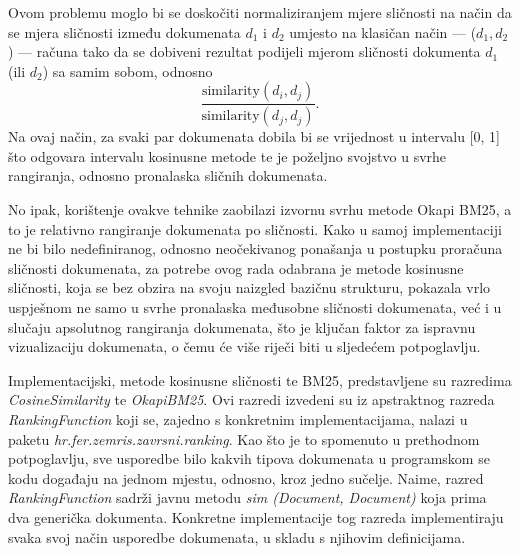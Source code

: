 \documentclass[times, utf8, zavrsni]{fer}
\begin{document}
Ovom problemu moglo bi se doskočiti normaliziranjem mjere sličnosti na način da se mjera sličnosti između dokumenata $d_1$ i $d_2$ umjesto na klasičan način — ($d_1, d_2$) — računa tako da se dobiveni rezultat podijeli mjerom sličnosti dokumenta $d_1$ (ili $d_2$) sa samim sobom, odnosno
\begin{equation}
\frac{\text{similarity}(d_i, d_j)}{\text{similarity}(d_j, d_j)}.
\label{eq:docsim}
\end{equation}
Na ovaj način, za svaki par dokumenata dobila bi se vrijednost u intervalu [0, 1] što odgovara intervalu kosinusne metode te je poželjno svojstvo u svrhe rangiranja, odnosno pronalaska sličnih dokumenata. \par
No ipak, korištenje ovakve tehnike zaobilazi izvornu svrhu metode Okapi BM25, a to je relativno rangiranje dokumenata po sličnosti. Kako u samoj implementaciji ne bi bilo nedefiniranog, odnosno neočekivanog ponašanja u postupku proračuna sličnosti dokumenata, za potrebe ovog rada odabrana je metode kosinusne sličnosti, koja se bez obzira na svoju naizgled bazičnu strukturu, pokazala vrlo uspješnom ne samo u svrhe pronalaska međusobne sličnosti dokumenata, već i u slučaju apsolutnog rangiranja dokumenata, što je ključan faktor za ispravnu vizualizaciju dokumenata, o čemu će više riječi biti u sljedećem potpoglavlju.

Implementacijski, metode kosinusne sličnosti te BM25, predstavljene su razredima \textit{CosineSimilarity} te \textit{OkapiBM25}. Ovi razredi izvedeni su iz apstraktnog razreda \textit{RankingFunction} koji se, zajedno s konkretnim implementacijama, nalazi u paketu \textit{hr.fer.zemris.zavrsni.ranking}. Kao što je to spomenuto u prethodnom potpoglavlju, sve usporedbe bilo kakvih tipova dokumenata u programskom se kodu događaju na jednom mjestu, odnosno, kroz jedno sučelje. Naime, razred \textit{RankingFunction} sadrži javnu metodu \textit{sim (Document, Document)} koja prima dva generička dokumenta. Konkretne implementacije tog razreda implementiraju svaka svoj način usporedbe dokumenata, u skladu s njihovim definicijama.
\end{document}

